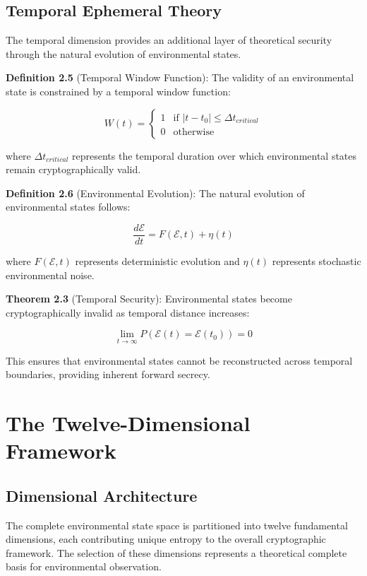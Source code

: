 \documentclass[12pt]{article}
\begin{document}
\subsection{Temporal Ephemeral Theory}

The temporal dimension provides an additional layer of theoretical security through the natural evolution of environmental states.

\textbf{Definition 2.5} (Temporal Window Function): The validity of an environmental state is constrained by a temporal window function:

$$W(t) = \begin{cases}
1 & \text{if } |t - t_0| \leq \Delta t_{critical} \\
0 & \text{otherwise}
\end{cases}$$

where $\Delta t_{critical}$ represents the temporal duration over which environmental states remain cryptographically valid.

\textbf{Definition 2.6} (Environmental Evolution): The natural evolution of environmental states follows:

$$\frac{d\mathcal{E}}{dt} = F(\mathcal{E}, t) + \eta(t)$$

where $F(\mathcal{E}, t)$ represents deterministic evolution and $\eta(t)$ represents stochastic environmental noise.

\textbf{Theorem 2.3} (Temporal Security): Environmental states become cryptographically invalid as temporal distance increases:

$$\lim_{t \to \infty} P(\mathcal{E}(t) = \mathcal{E}(t_0)) = 0$$

This ensures that environmental states cannot be reconstructed across temporal boundaries, providing inherent forward secrecy.

\section{The Twelve-Dimensional Framework}

\subsection{Dimensional Architecture}

The complete environmental state space is partitioned into twelve fundamental dimensions, each contributing unique entropy to the overall cryptographic framework. The selection of these dimensions represents a theoretical complete basis for environmental observation.
\end{document}
